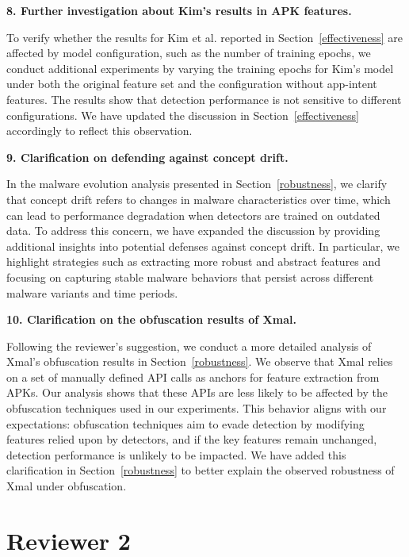 \vspace{0.1cm}
\noindent \textbf{8. Further investigation about Kim's results in APK features.}

To verify whether the results for Kim et al. reported in Section~\ref{effectiveness} are affected by model configuration, such as the number of training epochs, we conduct additional experiments by varying the training epochs for Kim's model under both the original feature set and the configuration without app-intent features.
The results show that detection performance is not sensitive to different configurations. We have updated the discussion in Section~\ref{effectiveness} accordingly to reflect this observation.

\noindent \textbf{9. Clarification on defending against concept drift.}

In the malware evolution analysis presented in Section~\ref{robustness}, we clarify that concept drift refers to changes in malware characteristics over time, which can lead to performance degradation when detectors are trained on outdated data. To address this concern, we have expanded the discussion by providing additional insights into potential defenses against concept drift. In particular, we highlight strategies such as extracting more robust and abstract features and focusing on capturing stable malware behaviors that persist across different malware variants and time periods.

\vspace{0.1cm}
\noindent \textbf{10. Clarification on the obfuscation results of Xmal.}

Following the reviewer's suggestion, we conduct a more detailed analysis of Xmal's obfuscation results in Section~\ref{robustness}. We observe that Xmal relies on a set of manually defined API calls as anchors for feature extraction from APKs. Our analysis shows that these APIs are less likely to be affected by the obfuscation techniques used in our experiments.
This behavior aligns with our expectations: obfuscation techniques aim to evade detection by modifying features relied upon by detectors, and if the key features remain unchanged, detection performance is unlikely to be impacted. We have added this clarification in Section~\ref{robustness} to better explain the observed robustness of Xmal under obfuscation.

\newpage
\section*{Reviewer 2}

